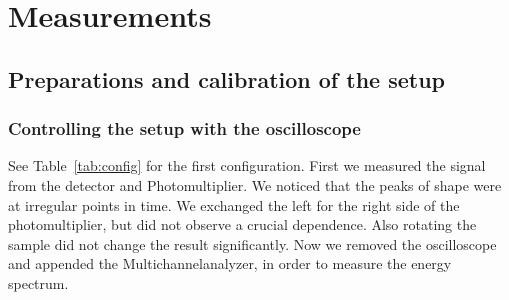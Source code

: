 \section{Measurements}
\label{sec:measurements}

\subsection{Preparations and calibration of the setup}
\label{sub:preparations_and_calibration_of_the_setup}
\subsubsection{Controlling the setup with the oscilloscope}
\label{ssub:Controlling the setup with the oscilloscope}
See Table~\ref{tab:config} for the first configuration. 
First we measured the signal from the detector and Photomultiplier. We noticed
that the peaks of shape were at irregular points in time. We exchanged the left for the right side
of the photomultiplier, but did not observe a crucial dependence. Also rotating the sample did not
change the result significantly. Now we removed the oscilloscope and appended the Multichannelanalyzer,
in order to measure the energy spectrum. \\
\\

